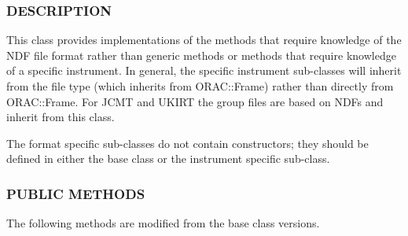 \subsubsection*{DESCRIPTION\label{ORAC::Frame::NDF_DESCRIPTION}}


This class provides implementations of the methods that require
knowledge of the NDF file format rather than generic methods or
methods that require knowledge of a specific instrument.  In general,
the specific instrument sub-classes will inherit from the file type
(which inherits from ORAC::Frame) rather than directly from
ORAC::Frame. For JCMT and UKIRT the group files are based on NDFs and
inherit from this class.



The format specific sub-classes do not contain constructors; they
should be defined in either the base class or the instrument specific
sub-class.

\subsubsection*{PUBLIC METHODS\label{ORAC::Frame::NDF_PUBLIC_METHODS}}


The following methods are modified from the base class versions.

